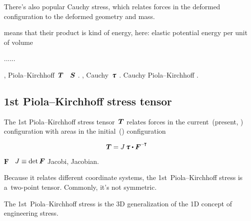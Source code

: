 There’s also popular Cauchy stress, which relates forces in the deformed configuration to the deformed geometry and mass.

 means that their product is kind of energy, here: elastic potential energy per unit of volume

......

, Piola\hbox{--}Kirchhoff~${\bm{T}}$ ~${\bm{S}}$   .
, Cauchy~${\cauchystress}$   .
\en{,} Cauchy Piola\hbox{--}Kirchhoff .

\subsection*{1st Piola\hbox{--}Kirchhoff stress tensor}

The 1st Piola\hbox{--}Kirchhoff stress tensor~$\bm{T}$ relates forces in the current~(present, ) configuration with areas in the initial~() configuration

\noindent\vspace{-0.2em}\begin{equation*}
\firstpiolakirchhoffstress = J \, \cauchystress \dotp \bm{F}^{\expminusT}
\end{equation*}

\vspace{-0.2em}\noindent
{} $\bm{F}$   ~${J \equiv \operatorname{det} \bm{F}}$  Jacobi, Jacobian.

Because it relates different coordinate systems, the 1st~Piola\hbox{--}Kirchhoff stress is a~two\hbox{-}point tensor.
Commonly, it’s not symmetric.

The 1st~Piola\hbox{--}Kirchhoff stress is the 3D generalization of the 1D concept of engineering stress.

